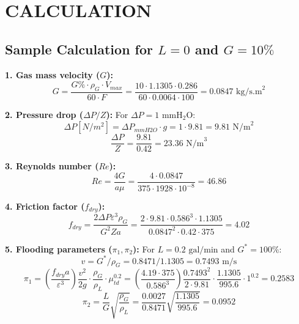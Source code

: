 \section{CALCULATION}

\subsection{Sample Calculation for \texorpdfstring{$L=0$}{L=0} and \texorpdfstring{$G=10\%$}{G=10\%}}

\textbf{1. Gas mass velocity ($G$):}
\begin{equation}
    G = \frac{G\% \cdot \rho_G \cdot V_{max}}{60 \cdot F} = \frac{10 \cdot 1.1305 \cdot 0.286}{60 \cdot 0.0064 \cdot 100} = 0.0847 \text{ kg/s.m}^2
\end{equation}

\textbf{2. Pressure drop ($\Delta P/Z$):}
For $\Delta P = 1 \text{ mmH}_2\text{O}$:
\begin{equation}
    \Delta P [N/m^2] = \Delta P_{mmH2O} \cdot g = 1 \cdot 9.81 = 9.81 \text{ N/m}^2
\end{equation}
\begin{equation}
    \frac{\Delta P}{Z} = \frac{9.81}{0.42} = 23.36 \text{ N/m}^3
\end{equation}

\textbf{3. Reynolds number ($Re$):}
\begin{equation}
    Re = \frac{4G}{a \mu} = \frac{4 \cdot 0.0847}{375 \cdot 1928 \cdot 10^{-8}} = 46.86
\end{equation}

\textbf{4. Friction factor ($f_{dry}$):}
\begin{equation}
    f_{dry} = \frac{2 \Delta P \varepsilon^3 \rho_G}{G^2 Z a} = \frac{2 \cdot 9.81 \cdot 0.586^3 \cdot 1.1305}{0.0847^2 \cdot 0.42 \cdot 375} = 4.02
\end{equation}

\textbf{5. Flooding parameters ($\pi_1, \pi_2$):}
For $L = 0.2 \text{ gal/min}$ and $G^* = 100\%$:
\begin{equation}
    v = G^* / \rho_G = 0.8471 / 1.1305 = 0.7493 \text{ m/s}
\end{equation}
\begin{equation}
    \pi_1 = \left( \frac{f_{dry} a}{\varepsilon^3} \right) \frac{v^2}{2g} \cdot \frac{\rho_G}{\rho_L} \cdot \mu_{td}^{0.2} = \left( \frac{4.19 \cdot 375}{0.586^3} \right) \frac{0.7493^2}{2 \cdot 9.81} \cdot \frac{1.1305}{995.6} \cdot 1^{0.2} = 0.2583
\end{equation}
\begin{equation}
    \pi_2 = \frac{L}{G} \sqrt{\frac{\rho_G}{\rho_L}} = \frac{0.0027}{0.8471} \sqrt{\frac{1.1305}{995.6}} = 0.0952
\end{equation}
